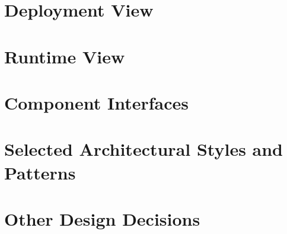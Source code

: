 \section{Deployment View}

\section{Runtime View}

\section{Component Interfaces}

\section{Selected Architectural Styles and Patterns}

\section{Other Design Decisions}
